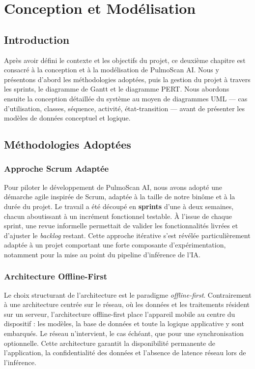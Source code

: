 \documentclass[12pt,a4paper]{report}
\begin{document}
\chapter{Conception et Modélisation}

\section*{Introduction}
Après avoir défini le contexte et les objectifs du projet, ce deuxième chapitre est consacré à la conception et à la modélisation de PulmoScan AI. Nous y présentons d'abord les méthodologies adoptées, puis la gestion du projet à travers les sprints, le diagramme de Gantt et le diagramme PERT. Nous abordons ensuite la conception détaillée du système au moyen de diagrammes UML --- cas d'utilisation, classes, séquence, activité, état-transition --- avant de présenter les modèles de données conceptuel et logique.

\section{Méthodologies Adoptées}

\subsection{Approche Scrum Adaptée}
Pour piloter le développement de PulmoScan AI, nous avons adopté une démarche agile inspirée de Scrum, adaptée à la taille de notre binôme et à la durée du projet. Le travail a été découpé en \textbf{sprints} d'une à deux semaines, chacun aboutissant à un incrément fonctionnel testable. À l'issue de chaque sprint, une revue informelle permettait de valider les fonctionnalités livrées et d'ajuster le \textit{backlog} restant. Cette approche itérative s'est révélée particulièrement adaptée à un projet comportant une forte composante d'expérimentation, notamment pour la mise au point du pipeline d'inférence de l'IA.

\subsection{Architecture Offline-First}
Le choix structurant de l'architecture est le paradigme \textit{offline-first}. Contrairement à une architecture centrée sur le réseau, où les données et les traitements résident sur un serveur, l'architecture offline-first place l'appareil mobile au centre du dispositif : les modèles, la base de données et toute la logique applicative y sont embarqués. Le réseau n'intervient, le cas échéant, que pour une synchronisation optionnelle. Cette architecture garantit la disponibilité permanente de l'application, la confidentialité des données et l'absence de latence réseau lors de l'inférence.
\end{document}
